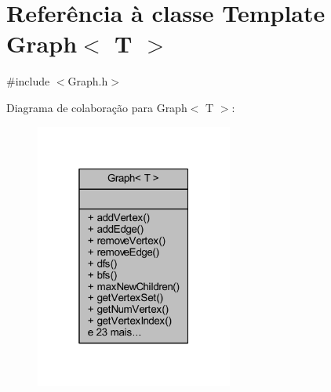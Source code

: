 \hypertarget{class_graph}{}\section{Referência à classe Template Graph$<$ T $>$}
\label{class_graph}


{\ttfamily \#include $<$Graph.\+h$>$}



Diagrama de colaboração para Graph$<$ T $>$\+:
\nopagebreak
\begin{figure}[H]
\begin{center}
\leavevmode
\includegraphics[width=184pt]{class_graph__coll__graph}
\end{center}
\end{figure}

